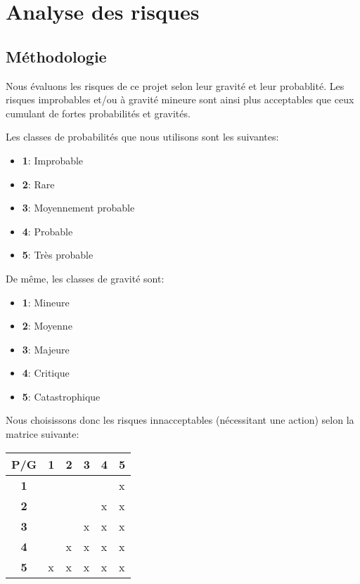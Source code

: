 \chapter{Analyse des risques}

\section{Méthodologie}
Nous évaluons les risques de ce projet selon leur gravité et leur probablité. Les risques improbables et/ou à gravité mineure sont ainsi plus acceptables que ceux cumulant de fortes probabilités et gravités.

Les classes de probabilités que nous utilisons sont les suivantes:

\begin{itemize}
  \item \textbf{1}: Improbable 
  \item \textbf{2}: Rare
  \item \textbf{3}: Moyennement probable
  \item \textbf{4}: Probable
  \item \textbf{5}: Très probable
\end{itemize}

De même, les classes de gravité sont:

\begin{itemize}
  \item \textbf{1}: Mineure 
  \item \textbf{2}: Moyenne
  \item \textbf{3}: Majeure
  \item \textbf{4}: Critique
  \item \textbf{5}: Catastrophique
\end{itemize}

Nous choisissons donc les risques innacceptables (nécessitant une action) selon la matrice suivante:

\begin{tabular}{|c|l|l|l|l|l|}
     \hline
         P/G & \textbf{1} & \textbf{2} & \textbf{3} & \textbf{4} & \textbf{5}  \\ \hline
         \textbf{1} &   &   &   &   & x \\ \hline
         \textbf{2} &   &   &   & x & x \\ \hline
         \textbf{3} &   &   & x & x & x \\ \hline
         \textbf{4} &   & x & x & x & x \\ \hline
         \textbf{5} & x & x & x & x & x \\
     \hline
\end{tabular}

